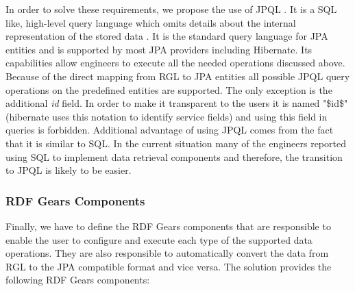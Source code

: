 In order to solve these requirements, we propose the use of JPQL \cite{linwood2010beginning}. It is a SQL like, high-level query language which omits details about the internal representation of the stored data \cite{linwood2010beginning}. It is the standard query language for JPA entities and is supported by most JPA providers including Hibernate. Its capabilities allow engineers to execute all the needed operations discussed above. Because of the direct mapping from RGL to JPA entities all possible JPQL query operations on the predefined entities are supported. The only exception is the additional \textit{id} field. In order to make it transparent to the users it is named "\$id\$"(hibernate uses this notation to identify service fields) and using this field in queries is forbidden. Additional advantage of using JPQL comes from the fact that it is similar to SQL. In the current situation many of the engineers reported using SQL to implement data retrieval components and therefore, the transition to JPQL is likely to be easier.


\subsubsection{RDF Gears Components}
Finally, we have to define the RDF Gears components that are responsible to enable the user to configure and execute each type of the supported data operations. They are also responsible to automatically convert the data from RGL to the JPA compatible format and vice versa. The solution provides the following RDF Gears components:

